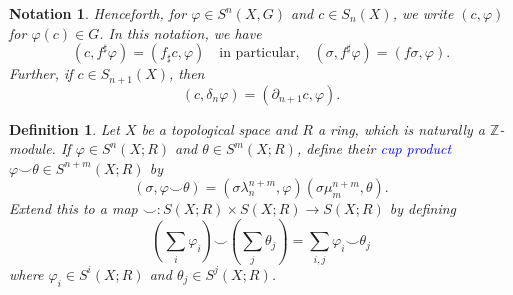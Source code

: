\documentclass[10pt]{article}
\theoremstyle{thmstyle}
\theoremstyle{defstyle}
\newtheorem{definition}[theorem]{Definition}
\newtheorem*{notation}{Notation}
\newcommand{\Z}{\mathbb{Z}}
\newcommand{\define}[1]{\textcolor{blue}{\textit{#1}}}
\begin{document}
\begin{notation}
    Henceforth, for $\varphi\in S^n(X, G)$ and $c\in S_n(X)$, we write $(c,\varphi)$ for $\varphi(c)\in G$. In this notation, we have 
    \begin{equation*}
        (c, f^\sharp\varphi) = (f_\sharp c, \varphi)\quad\text{in particular,}\quad (\sigma, f^\sharp\varphi) = (f\sigma, \varphi).
    \end{equation*}
    Further, if $c\in S_{n + 1}(X)$, then 
    \begin{equation*}
        (c, \delta_n\varphi) = (\partial_{n + 1}c, \varphi).
    \end{equation*}
\end{notation}

\begin{definition}
    Let $X$ be a topological space and $R$ a ring, which is naturally a $\Z$-module. If $\varphi\in S^n(X; R)$ and $\theta\in S^m(X; R)$, define their \define{cup product} $\varphi\smile\theta\in S^{n + m}(X; R)$ by 
    \begin{equation*}
        (\sigma, \varphi\smile\theta) = (\sigma\lambda_n^{n + m}, \varphi)(\sigma\mu_m^{n + m}, \theta).
    \end{equation*}
    Extend this to a map $\smile: S(X; R)\times S(X; R)\to S(X; R)$ by defining 
    \begin{equation*}
        \left(\sum_i\varphi_i\right)\smile\left(\sum_j\theta_j\right) = \sum_{i, j}\varphi_i\smile\theta_j
    \end{equation*}
    where $\varphi_i\in S^i(X; R)$ and $\theta_j\in S^j(X; R)$.
\end{definition}
\end{document}
